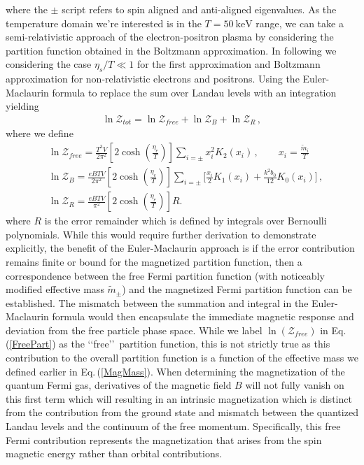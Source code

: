 \documentclass[universe,article,submit,moreauthors,pdftex,a4paper]{Definitions/mdpi}
\newcommand{\req}[1]{Eq.\,(\ref{#1})}
\begin{document}
where the $\pm$ script refers to spin aligned and anti-aligned eigenvalues. As the temperature domain we're interested is in the $T=50\ \mathrm{keV}$ range, we can take a semi-relativistic approach of the electron-positron plasma by considering the partition function obtained in the Boltzmann approximation. In following we considering the case $\eta_s/T\ll1$ for the first approximation and Boltzmann approximation for non-relativistic electrons and positrons. Using the Euler-Maclaurin formula to replace the sum over Landau levels with an integration yielding
\begin{align}
 \ln\mathcal{Z}_{tot}=\ln\mathcal{Z}_{free}+\ln\mathcal{Z}_B+\ln\mathcal{Z}_R\,,
\end{align}
where we define 
\begin{align}
 \label{FreePart}&\ln\mathcal{Z}_{free}=\frac{T^3V}{2\pi^2}\left[2\cosh{\left(\frac{\eta_{e}}{T}\right)}\right]\sum_{i=\pm}x_i^2K_2\left(x_i\right)\,,\qquad x_i=\frac{\tilde{m}_i}{T}\\
 \label{MagPart}&\ln\mathcal{Z}_B=\frac{eBTV}{2\pi^2}\left[2\cosh{\left(\frac{\eta_{e}}{T}\right)}\right]\sum_{i=\pm}\bigg[\frac{x_i}{2}K_1\left(x_i\right)+\frac{k^2b_0}{12}K_0\left(x_i\right)\bigg]\,,\\
 \label{ErrorPart}&\ln\mathcal{Z}_R=\frac{eBTV}{\pi^2}\left[2\cosh{\left(\frac{\eta_{e}}{T}\right)}\right]R.
\end{align}
where $R$ is the error remainder which is defined by integrals over Bernoulli polynomials.
While this would require further derivation to demonstrate explicitly, the benefit of the Euler-Maclaurin approach is if the error contribution remains finite or bound for the magnetized partition function, then a correspondence between the free Fermi partition function (with noticeably modified effective mass $\tilde{m}_{\pm}$) and the magnetized Fermi partition function can be established. The mismatch between the summation and integral in the Euler-Maclaurin formula would then encapsulate the immediate magnetic response and deviation from the free particle phase space. While we label $\ln(\mathcal{Z}_{free})$ in \req{FreePart} as the \lq\lq free\rq\rq\ partition function, this is not strictly true as this contribution to the overall partition function is a function of the effective mass we defined earlier in \req{MagMass}. When determining the magnetization of the quantum Fermi gas, derivatives of the magnetic field $B$ will not fully vanish on this first term which will resulting in an intrinsic magnetization which is distinct from the contribution from the ground state and mismatch between the quantized Landau levels and the continuum of the free momentum. Specifically, this free Fermi contribution represents the magnetization that arises from the spin magnetic energy rather than orbital contributions.
\end{document}
